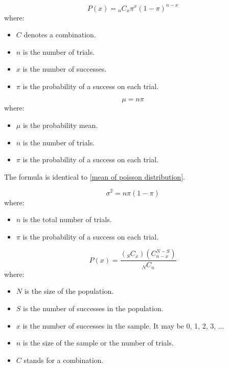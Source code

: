 \begin{equation}
\label{binomial probability distribution}
P(x) = {}_nC_{x}\pi^{x}(1 - \pi)^{n - x}
\end{equation}
where: 
\begin{itemize}
 \item $C$ denotes a combination.
 \item $n$ is the number of trials.
 \item $x$ is the number of successes.
 \item $\pi$ is the probability of a success on each trial.
\end{itemize}
\hformbar


\begin{equation}
\label{mean of a binomial distribution}
\mu = n\pi
\end{equation}
where: 
\begin{itemize}
 \item $\mu$ is the probability mean.
 \item $n$ is the number of trials.
 \item $\pi$ is the probability of a success on each trial.
\end{itemize}
The formula is identical to \eqref{mean of poisson distribution}. 
\hformbar


\begin{equation}
\label{variance of a binomial distribution}
\sigma^{2} = n\pi(1 - \pi)
\end{equation}
where: 
\begin{itemize}
 \item $n$ is the total number of trials.
 \item $\pi$ is the probability of a success on each trial.
\end{itemize}
\hformbar


\begin{equation}
\label{hypergeometric distribution}
P(x) = \frac{({}_SC_{x})(C^{N-S}_{n-x})}{{}_NC_{n}}
\end{equation}
where: 
\begin{itemize}
 \item $N$ is the size of the population.
 \item $S$ is the number of successes in the population.
 \item $x$ is the number of successes in the sample. It may be 0, 1, 2, 3, ...
 \item $n$ is the size of the sample or the number of trials.
 \item $C$ stands for a combination.
\end{itemize}
\hformbar


